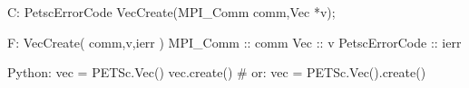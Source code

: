 C:
PetscErrorCode VecCreate(MPI_Comm comm,Vec *v);

F:
VecCreate( comm,v,ierr )
MPI_Comm :: comm
Vec      :: v
PetscErrorCode :: ierr

Python:
vec = PETSc.Vec()
vec.create()
# or:
vec = PETSc.Vec().create()

